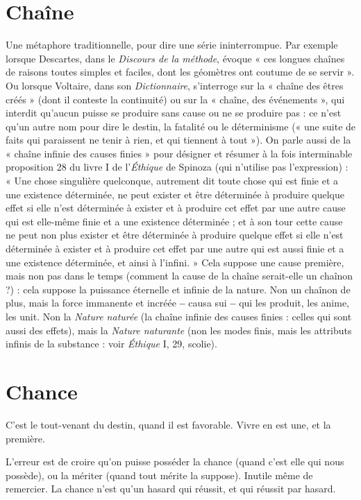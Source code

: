 \section{Chaîne}
Une métaphore traditionnelle, pour dire une série ininterrompue.
Par exemple lorsque Descartes, dans le {\it Discours de la
méthode}, évoque « ces longues chaînes de raisons toutes simples et faciles, dont
les géomètres ont coutume de se servir ». Ou lorsque Voltaire, dans son {\it Dictionnaire},
s'interroge sur la « chaîne des êtres créés » (dont il conteste la continuité)
ou sur la « chaîne, des événements », qui interdit qu'aucun puisse se produire
sans cause ou ne se produire pas : ce n’est qu’un autre nom pour dire le
destin, la fatalité ou le déterminisme (« une suite de faits qui paraissent ne tenir
à rien, et qui tiennent à tout »). On parle aussi de la « chaîne infinie des causes
finies » pour désigner et résumer à la fois interminable proposition 28 du
livre I de l'{\it Éthique} de Spinoza (qui n'utilise pas l'expression) : « Une chose singulière
quelconque, autrement dit toute chose qui est finie et a une existence
déterminée, ne peut exister et être déterminée à produire quelque effet si elle
n’est déterminée à exister et à produire cet effet par une autre cause qui est elle-même
finie et a une existence déterminée ; et à son tour cette cause ne peut non
plus exister et être déterminée à produire quelque effet si elle n’est déterminée
à exister et à produire cet effet par une autre qui est aussi finie et a une existence
déterminée, et ainsi à l’infini. » Cela suppose une cause première, mais non pas
dans le temps (comment la cause de la chaîne serait-elle un chaînon ?) : cela
suppose la puissance éternelle et infinie de la nature. Non un chaînon de plus,
mais la force immanente et incréée {\bf --} causa sui {\bf --} qui les produit, les anime, les
unit. Non la {\it Nature naturée} (la chaîne infinie des causes finies : celles qui sont
aussi des effets), mais la {\it Nature naturante} (non les modes finis, mais les attributs
infinis de la substance : voir {\it Éthique} I, 29, scolie).

\section{Chance}
C'est le tout-venant du destin, quand il est favorable. Vivre en est
une, et la première.

L'erreur est de croire qu’on puisse posséder la chance (quand c’est elle qui
nous possède), ou la mériter (quand tout mérite la suppose). Inutile même de
remercier. La chance n’est qu’un hasard qui réussit, et qui réussit par hasard.

